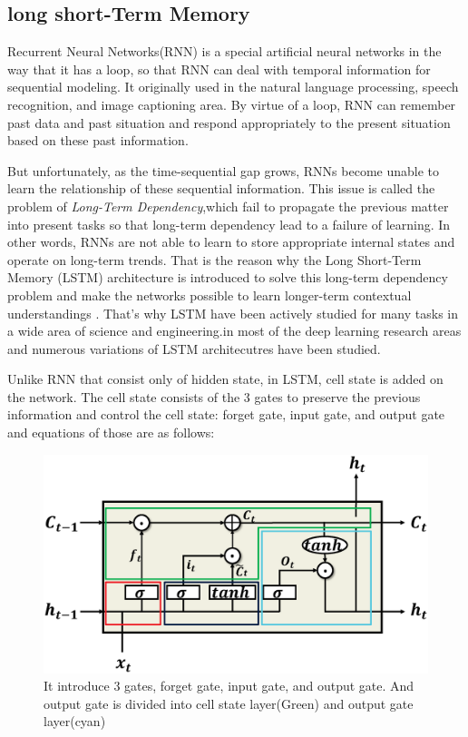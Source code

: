 \documentclass{ieeeaccess}
\begin{document}
\subsection{long short-Term Memory}

Recurrent Neural Networks(RNN) is a special artificial neural networks in the way that it has a loop, so that RNN can deal with temporal information for sequential modeling. It originally used in the natural language processing, speech recognition, and image captioning area. By virtue of a loop, RNN can remember past data and past situation and respond appropriately to the present situation based on these past information. 

But unfortunately, as the time-sequential gap grows, RNNs become unable to learn the relationship of these sequential information. This issue is called the problem of \textit{Long-Term Dependency},which fail to propagate the previous matter into present tasks so that long-term dependency lead to a failure of learning. In other words, RNNs are not able to learn to store appropriate internal states and operate on long-term trends. That is the reason why the Long Short-Term Memory (LSTM) architecture is introduced to solve this long-term dependency problem and make the networks possible to learn longer-term contextual
understandings \cite{hochreiter1997long}. That's why LSTM have been actively studied for many tasks in a wide area of science and engineering.in most of the deep learning research areas and numerous variations of LSTM architecutres have been studied.

Unlike RNN that consist only of hidden state, in LSTM, cell state is added on the network. The cell state consists of the 3 gates to preserve the previous information and control the cell state: forget gate, input gate, and output gate and equations of those are as follows:

\begin{figure}[h]
	\centering
	\includegraphics[width=.4\textwidth]{image/basic_LSTM_revised}
	\caption{It introduce 3 gates, forget gate, input gate, and output gate. And output gate is divided into cell state layer(Green) and output gate layer(cyan) 
	}
	\label{fig:basic_lstm}
\end{figure}
\end{document}
